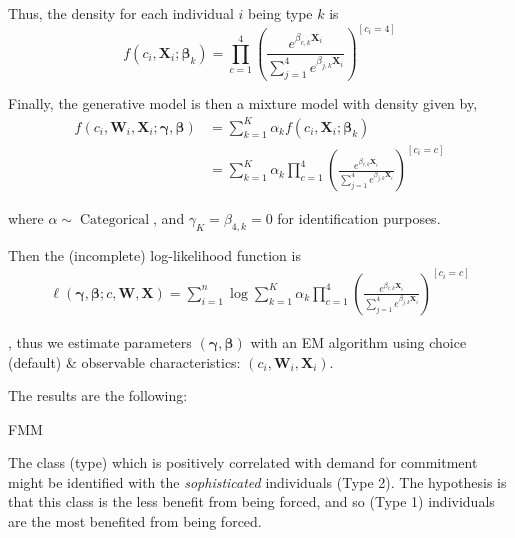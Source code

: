 \documentclass[oneside,11pt]{article}
\begin{document}
Thus, the density for each individual $i$ being type $k$ is
\[f(c_i,\mathbf{X}_i; \bm\beta_{k}) = \prod_{c=1}^4\left(\frac{e^{\beta_{c,k} \mathbf{X}_i}}{\sum_{j=1}^{4} e^{\beta_{j,k}  \mathbf{X}_i}}\right)^{[c_i=4]}\]

Finally, the generative model is then a mixture model with density given by,
\begin{align*}
    f(c_i ,\mathbf{W}_i, \mathbf{X}_i; \bm{\gamma},\bm{\beta}) &= \sum_{k=1}^K \alpha_k f(c_i,\mathbf{X}_i; \bm\beta_{k}) \\
    &= \sum_{k=1}^K \alpha_k \prod_{c=1}^4\left(\frac{e^{\beta_{c,k} \mathbf{X}_i}}{\sum_{j=1}^{4} e^{\beta_{j,k}  \mathbf{X}_i}}\right)^{[c_i=c]} 
\end{align*}



where $\alpha\sim \operatorname{Categorical}$, and $\gamma_{K} = \beta_{4,k}=0$ for identification purposes. 

Then the (incomplete) log-likelihood function is
\begin{align*}
    \ell(\bm{\gamma}, \bm{\beta}; c, \mathbf{W},  \mathbf{X}) = \sum_{i=1}^n \log\sum_{k=1}^K \alpha_k \prod_{c=1}^4\left(\frac{e^{\beta_{c,k} \mathbf{X}_i}}{\sum_{j=1}^{4} e^{\beta_{j,k}  \mathbf{X}_i}}\right)^{[c_i=c]} 
\end{align*}

, thus we estimate parameters $(\bm{\gamma}, \bm{\beta})$ with an EM algorithm using choice (default)
\& observable characteristics: $(c_i,\mathbf{W}_i,\mathbf{X}_i)$.

The results are the following:

\begin{table}[H]
\caption{FMM}
\label{FMM}
\begin{center}
\scriptsize{}
\end{center}
 \scriptsize

\end{table}



The class (type) which is positively correlated with demand for commitment might be identified with the \emph{sophisticated} individuals (Type 2). The hypothesis is that this class is the less benefit from being forced, and so (Type 1) individuals are the most benefited from being forced.
\end{document}
